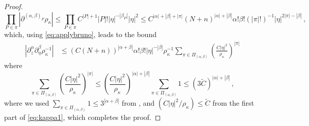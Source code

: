 \documentclass[
	fontsize=11pt, 
	twoside=false, 
	abstract=true, 
	a4paper,
]{scrartcl}
\newcommand{\abs}[1]{\left\lvert#1\right\rvert}
\newcommand{\del}{\partial}
\newcommand{\td}[1]{\tilde{#1}}
\newcommand{\an}{\quad\text{and}\quad}
\begin{document}
\begin{proof}
	\[
		\prod_{P\in\pi}\abs{\del^{(\alpha,\beta)_P}\rho_\kappa}\leq \prod_{P\in\pi} C^{\abs{P}+1}\abs{P}!\abs{\eta}^{-\abs{\beta_P}}\abs{\eta}^{2} \leq C^{\abs{\alpha}+\abs{\beta}+\abs{\pi}}(N+n)^{\abs{\alpha}+\abs{\beta}} \alpha!\beta! (\abs{\pi}!)^{-1} \abs{\eta}^{2\abs{\pi}-\abs{\beta}}\,,
	\]
	which, using \cref{eq:applybruno}, leads to the bound
	\begin{align*}
		\abs{\del^\alpha_{z}\del^\beta_{\eta}\rho_\kappa^{-1}} %
		&\leq (C(N+n))^{\abs{\alpha+\beta}}\alpha!\beta!\abs{\eta}^{-\abs{\beta}}\rho_\kappa^{-1}\sum_{\pi\in\Pi_{(\alpha,\beta)}}\left(\frac{C\abs{\eta}^{2}}{\rho_\kappa}\right)^{\abs{\pi}}
	\end{align*}
	where 
	\[
		\sum_{\pi\in\Pi_{(\alpha,\beta)}}\left(\frac{C\abs{\eta}^{2}}{\rho_\kappa}\right)^{\abs{\pi}} \leq \left(\frac{C\abs{\eta}^{2}}{\rho_\kappa}\right)^{\abs{\alpha}+\abs{\beta}}\sum_{\pi\in\Pi_{(\alpha,\beta)}}1 \leq (3\td{C})^{\abs{\alpha}+\abs{\beta}}\,,
	\]
	where we used $\sum_{\pi\in\Pi_{(\alpha,\beta)}} 1 \leq 3^{\abs{\alpha+\beta}}$ from \cite{zbMATH05636932}, and $(C\abs{\eta}^2/\rho_\kappa) \leq \td{C}$ from the first part of \cref{eq:kappa1}, which completes the proof.
%
%

\end{proof}
\end{document}
